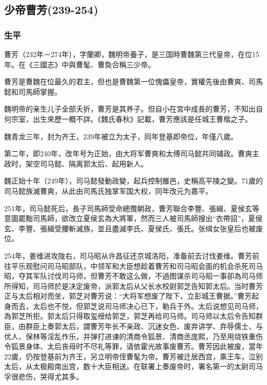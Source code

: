 
\subsection{少帝曹芳\tiny(239-254)}

\subsubsection{生平}

曹芳（232年－274年），字蘭卿，魏明帝養子，是三国時曹魏第三代皇帝，在位15年。在《三國志》中與曹髦、曹奐合稱三少帝。

曹芳是曹魏在位最久的君主，但也是曹魏第一位傀儡皇帝，實權先後由曹爽、司馬懿和司馬師掌握。

魏明帝的亲生儿子全部夭折，曹芳是其养子。但自小在宮中成長的曹芳，不知出自何宗室，出生來歷一概不詳。《魏氏春秋》記載，曹芳應該是任城王曹楷之子。

魏青龙三年，封为齐王，239年被立为太子，同年登基即帝位，年僅八歲。

第二年，即240年，改年号为正始，由大将军曹爽和太傅司马懿共同辅政。曹爽主政时，架空司马懿、隔离郭太后、起用新人。

魏正始十年（249年），司马懿發動政變，起兵控制雒邑，史稱高平陵之變。71歲的司马懿族滅曹爽，从此由司馬氏独掌军国大权，同年改元为嘉平。

251年，司马懿死后，長子司馬師受命總攬朝政，曹芳聯合李豐、張緝、夏侯玄等意圖罷黜司馬師，欲改立夏侯玄為大將軍，然而三人被司馬師搜出“衣帶詔”，夏侯玄、李豐、張緝受腰斬滅族，並且盡滅李氏、夏侯氏、張氏。张缉女张皇后也被废位。

254年，姜维进攻陇右，司马昭从许昌征还京城洛阳，准备前去讨伐姜维。曹芳前往平乐观慰问司马昭部队，中领军和大臣想趁着曹芳和司马昭会面的机会杀死司马昭，夺其军队讨伐司马师，但曹芳不敢这么做，不過图谋杀司马昭一事卻為司马师所得知，司马师於是决定废帝，派郭太后从父长水校尉郭芝告知郭太后。当时曹芳正与太后相对而坐，郭芝对曹芳说：“大将军想废了陛下，立彭城王曹据。”曹芳起身而去，太后也不悦，但郭芝说司马师决心已下，勒兵于外。太后说想见司马师，為郭芝所拒。郭太后只得取玺绶给郭芝，郭芝再给司马师。司马师以太后令告知群臣，由群臣上奏郭太后，謂曹芳年长不亲政、沉迷女色、废弃讲学、弃辱儒士、与优人、保林等淫乱作乐，并弹打进谏的清商令狐景、清商丞庞熙，乃至用烧铁重伤令狐景身体、太后丧母时不尽礼等罪，请依霍光故事废曹芳。曹芳因此被废，當年22歲，仍按登基前为齐王，另立明帝侄曹髦为帝。曹芳被迁居西宫，乘王车，泣别太后，从太极殿南出宫，数十大臣相送。在联署上奏废帝时，署名第一的太尉司马孚很悲伤，哭得尤其多。

